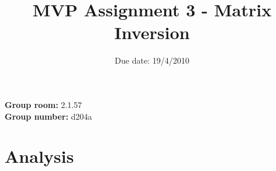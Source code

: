 \documentclass{article}
\title{MVP Assignment 3 - Matrix Inversion}
\date{Due date: 19/4/2010}
\begin{document}
\maketitle



\newcommand{\question}[1]{}
\newcommand{\answer}[1]{{#1}}

%
%
\answer{
\begin{flushleft}
{\bf Group room:} 2.1.57\\
{\bf Group number:} d204a\\
\end{flushleft}
}

\section{Analysis}

\question{
First we will analyse the code from \texttt{pmatrics.c} that you
discovered in the previous assignment. The example has been updated
for this assignment. The purpose is to parallize it using
\emph{pthreads}. The code supplied contains helpful comments.}
\end{document}

